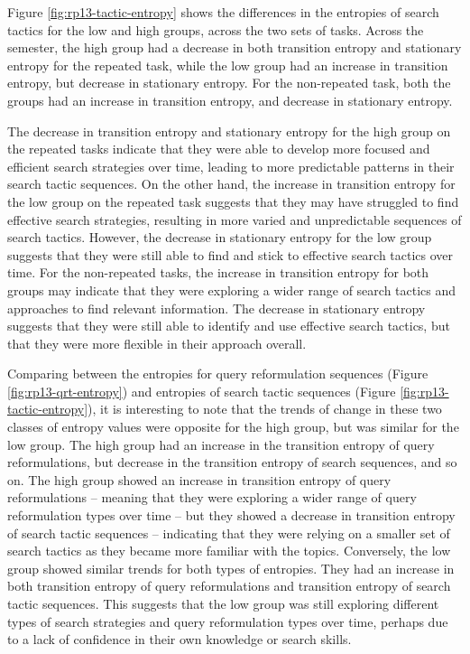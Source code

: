 \documentclass[letterpaper, nobind]{templates/ociamthesis}
\begin{document}
Figure \ref{fig:rp13-tactic-entropy} shows the differences in the entropies of search tactics for the low and high groups, across the two sets of tasks.
Across the semester, the high group had a decrease in both transition entropy and stationary entropy for the repeated task, while the low group had an increase in transition entropy, but decrease in stationary entropy.
For the non-repeated task, both the groups had an increase in transition entropy, and decrease in stationary entropy.

The decrease in transition entropy and stationary entropy for the high group on the repeated tasks indicate that they were able to develop more focused and efficient search strategies over time, leading to more predictable patterns in their search tactic sequences. On the other hand, the increase in transition entropy for the low group on the repeated task suggests that they may have struggled to find effective search strategies, resulting in more varied and unpredictable sequences of search tactics. However, the decrease in stationary entropy for the low group suggests that they were still able to find and stick to effective search tactics over time.
For the non-repeated tasks, the increase in transition entropy for both groups may indicate that they were exploring a wider range of search tactics and approaches to find relevant information. The decrease in stationary entropy suggests that they were still able to identify and use effective search tactics, but that they were more flexible in their approach overall.

Comparing between the entropies for query reformulation sequences (Figure \ref{fig:rp13-qrt-entropy}) and entropies of search tactic sequences (Figure \ref{fig:rp13-tactic-entropy}), it is interesting to note that the trends of change in these two classes of entropy values were opposite for the high group, but was similar for the low group.
The high group had an increase in the transition entropy of query reformulations, but decrease in the transition entropy of search sequences, and so on.
The high group showed an increase in transition entropy of query reformulations -- meaning that they were exploring a wider range of query reformulation types over time -- but they showed a decrease in transition entropy of search tactic sequences -- indicating that they were relying on a smaller set of search tactics as they became more familiar with the topics.
Conversely, the low group showed similar trends for both types of entropies. They had an increase in both transition entropy of query reformulations and transition entropy of search tactic sequences. This suggests that the low group was still exploring different types of search strategies and query reformulation types over time, perhaps due to a lack of confidence in their own knowledge or search skills.
\end{document}
